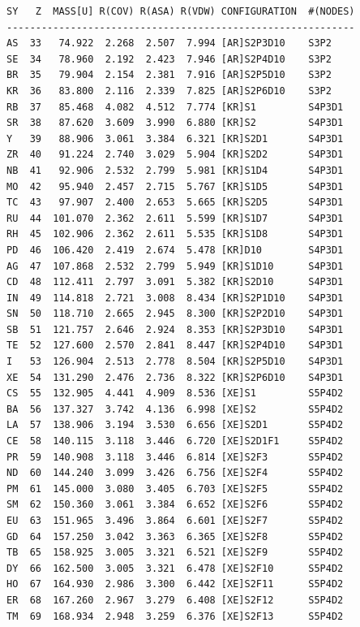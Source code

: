 \documentclass[final,12pt]{article}
\begin{document}
\begin{verbatim}
SY   Z  MASS[U] R(COV) R(ASA) R(VDW) CONFIGURATION  #(NODES)
------------------------------------------------------------
AS  33   74.922  2.268  2.507  7.994 [AR]S2P3D10    S3P2      
SE  34   78.960  2.192  2.423  7.946 [AR]S2P4D10    S3P2      
BR  35   79.904  2.154  2.381  7.916 [AR]S2P5D10    S3P2      
KR  36   83.800  2.116  2.339  7.825 [AR]S2P6D10    S3P2      
RB  37   85.468  4.082  4.512  7.774 [KR]S1         S4P3D1    
SR  38   87.620  3.609  3.990  6.880 [KR]S2         S4P3D1    
Y   39   88.906  3.061  3.384  6.321 [KR]S2D1       S4P3D1    
ZR  40   91.224  2.740  3.029  5.904 [KR]S2D2       S4P3D1    
NB  41   92.906  2.532  2.799  5.981 [KR]S1D4       S4P3D1    
MO  42   95.940  2.457  2.715  5.767 [KR]S1D5       S4P3D1    
TC  43   97.907  2.400  2.653  5.665 [KR]S2D5       S4P3D1    
RU  44  101.070  2.362  2.611  5.599 [KR]S1D7       S4P3D1    
RH  45  102.906  2.362  2.611  5.535 [KR]S1D8       S4P3D1    
PD  46  106.420  2.419  2.674  5.478 [KR]D10        S4P3D1    
AG  47  107.868  2.532  2.799  5.949 [KR]S1D10      S4P3D1    
CD  48  112.411  2.797  3.091  5.382 [KR]S2D10      S4P3D1    
IN  49  114.818  2.721  3.008  8.434 [KR]S2P1D10    S4P3D1    
SN  50  118.710  2.665  2.945  8.300 [KR]S2P2D10    S4P3D1    
SB  51  121.757  2.646  2.924  8.353 [KR]S2P3D10    S4P3D1    
TE  52  127.600  2.570  2.841  8.447 [KR]S2P4D10    S4P3D1    
I   53  126.904  2.513  2.778  8.504 [KR]S2P5D10    S4P3D1    
XE  54  131.290  2.476  2.736  8.322 [KR]S2P6D10    S4P3D1    
CS  55  132.905  4.441  4.909  8.536 [XE]S1         S5P4D2    
BA  56  137.327  3.742  4.136  6.998 [XE]S2         S5P4D2    
LA  57  138.906  3.194  3.530  6.656 [XE]S2D1       S5P4D2    
CE  58  140.115  3.118  3.446  6.720 [XE]S2D1F1     S5P4D2    
PR  59  140.908  3.118  3.446  6.814 [XE]S2F3       S5P4D2    
ND  60  144.240  3.099  3.426  6.756 [XE]S2F4       S5P4D2    
PM  61  145.000  3.080  3.405  6.703 [XE]S2F5       S5P4D2    
SM  62  150.360  3.061  3.384  6.652 [XE]S2F6       S5P4D2    
EU  63  151.965  3.496  3.864  6.601 [XE]S2F7       S5P4D2    
GD  64  157.250  3.042  3.363  6.365 [XE]S2F8       S5P4D2    
TB  65  158.925  3.005  3.321  6.521 [XE]S2F9       S5P4D2    
DY  66  162.500  3.005  3.321  6.478 [XE]S2F10      S5P4D2    
HO  67  164.930  2.986  3.300  6.442 [XE]S2F11      S5P4D2    
ER  68  167.260  2.967  3.279  6.408 [XE]S2F12      S5P4D2    
TM  69  168.934  2.948  3.259  6.376 [XE]S2F13      S5P4D2    
\end{verbatim}
\newpage
\end{document}
